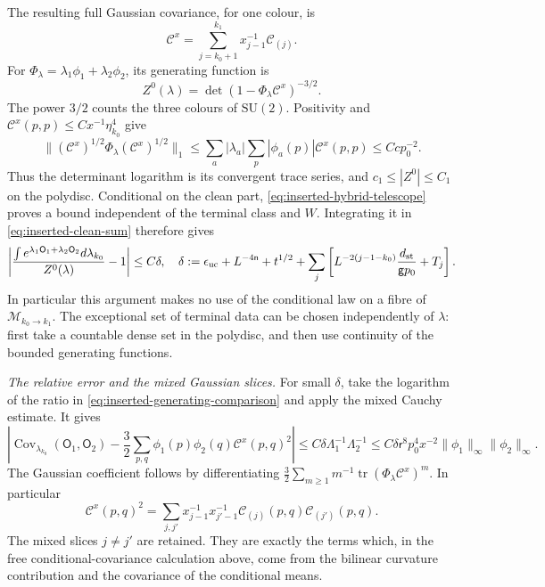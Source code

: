 \documentclass[11pt,letterpaper,reqno]{amsart}
\theoremstyle{definition}
\theoremstyle{remark}
\newcommand{\SU}{\mathrm{SU}}
\newcommand{\tr}{\operatorname{tr}}
\begin{document}
The resulting full Gaussian covariance, for one colour, is
\[
 \mathcal C^x=\sum_{j=k_0+1}^{k_1}x_{j-1}^{-1}\mathcal C_{(j)}.
\]
For $\Phi_\lambda=\lambda_1\phi_1+\lambda_2\phi_2$, its generating
function is
\begin{equation}\label{eq:inserted-gaussian-determinant}
 Z^0(\lambda)=\det(1-\Phi_\lambda\mathcal C^x)^{-3/2}.
\end{equation}
The power $3/2$ counts the three colours of $\SU(2)$. Positivity and
$\mathcal C^x(p,p)\le Cx^{-1}\eta_{k_0}^4$ give
\[
 \| (\mathcal C^x)^{1/2}\Phi_\lambda
                         (\mathcal C^x)^{1/2}\|_1
 \le\sum_a|\lambda_a|\sum_p|\phi_a(p)|\mathcal C^x(p,p)
 \le Cc p_0^{-2}.
\]
Thus the determinant logarithm is its convergent trace series, and
$c_1\le|Z^0|\le C_1$ on the polydisc. Conditional on the clean
part, \eqref{eq:inserted-hybrid-telescope} proves a bound independent
of the terminal class and $W$. Integrating it in
\eqref{eq:inserted-clean-sum} therefore gives
\begin{equation}\label{eq:inserted-generating-comparison}
 \left|\frac{\int e^{\lambda_1\mathsf O_1+\lambda_2\mathsf O_2}
                                  d\lambda_{k_0}}{Z^0(\lambda)}-1\right|
 \le C\delta,
 \quad
 \delta:=\epsilon_{\rm uc}+L^{-4\mathsf n}+t^{1/2}
       +\sum_j\left[
       L^{-2(j-1-k_0)}\frac{d_{\rm st}}{\mathsf g p_0}+T_j\right].
\end{equation}
In particular this argument makes no use of the conditional law on a
fibre of $\mathcal M_{k_0\to k_1}$. The exceptional set of terminal
data can be chosen independently of $\lambda$: first take a
countable dense set in the polydisc, and then use continuity of the
bounded generating functions.

\emph{The relative error and the mixed Gaussian slices.}
For small $\delta$, take the logarithm of the ratio in
\eqref{eq:inserted-generating-comparison} and apply the mixed Cauchy
estimate. It gives
\begin{equation}\label{eq:inserted-cumulant-comparison}
 \left|\operatorname{Cov}_{\lambda_{k_0}}(\mathsf O_1,\mathsf O_2)
       -\frac32\sum_{p,q}\phi_1(p)\phi_2(q)
                                      \mathcal C^x(p,q)^2\right|
 \le C\delta\Lambda_1^{-1}\Lambda_2^{-1}
 \le C\delta\mathsf r^8p_0^4x^{-2}
                       \|\phi_1\|_\infty\|\phi_2\|_\infty.
\end{equation}
The Gaussian coefficient follows by differentiating
$\frac32\sum_{m\ge1}m^{-1}\tr(\Phi_\lambda\mathcal C^x)^m$.
In particular
\[
 \mathcal C^x(p,q)^2
   =\sum_{j,j'}x_{j-1}^{-1}x_{j'-1}^{-1}
                            \mathcal C_{(j)}(p,q)\mathcal C_{(j')}(p,q).
\]
The mixed slices $j\ne j'$ are retained. They are exactly the terms
which, in the free conditional-covariance calculation above, come
from the bilinear curvature contribution and the covariance of the
conditional means.
\end{document}
